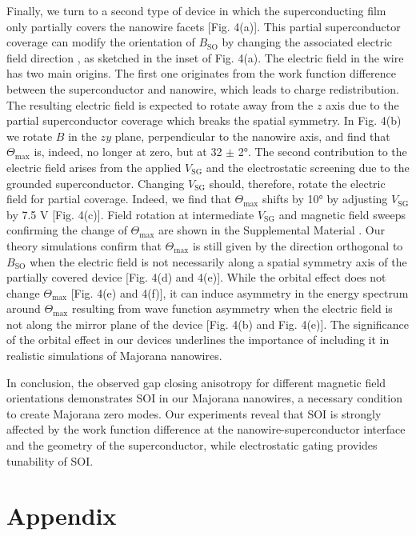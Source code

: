 Finally, we turn to a second type of device in which the superconducting film only partially covers the nanowire facets [Fig. 4(a)].
This partial superconductor coverage can modify the orientation of $B_{\mathrm{SO}}$ by changing the associated electric field direction \cite{Vuik2016}, as sketched in the inset of Fig. 4(a).
The electric field in the wire has two main origins.
The first one originates from the work function difference between the superconductor and nanowire, which leads to charge redistribution.
The resulting electric field is expected to rotate away from the $z$ axis due to the partial superconductor coverage which breaks the spatial symmetry.
In Fig. 4(b) we rotate $B$ in the $zy$ plane, perpendicular to the nanowire axis, and find that $\Theta_{\mathrm{max}}$ is, indeed, no longer at zero, but at 32 $\pm$ \ang{2}.
The second contribution to the electric field arises from the applied $V_{\mathrm{SG}}$ and the electrostatic screening due to the grounded superconductor.
Changing $V_{\mathrm{SG}}$ should, therefore, rotate the electric field for partial coverage.
Indeed, we find that $\Theta_{\mathrm{max}}$ shifts by \ang{10} by adjusting $V_{\mathrm{SG}}$ by 7.5 V [Fig. 4(c)].
Field rotation at intermediate $V_{\mathrm{SG}}$ and magnetic field sweeps confirming the change of $\Theta_{\mathrm{max}}$ are shown in the Supplemental Material \cite{Note1}.
Our theory simulations confirm that $\Theta_{\mathrm{max}}$ is still given by the direction orthogonal to $B_{\mathrm{SO}}$ when the electric field is not necessarily along a \mbox{spatial} symmetry axis of the partially covered device [Fig. 4(d) and 4(e)].
While the orbital effect does not change $\Theta_{\mathrm{max}}$ [Fig. 4(e) and 4(f)], it can induce asymmetry in the energy spectrum around $\Theta_{\mathrm{max}}$ resulting from wave function asymmetry when the electric field is not along the mirror plane of the device [Fig. 4(b) and Fig. 4(e)].
The significance of the orbital effect in our devices underlines the importance of including it in realistic simulations of Majorana nanowires.

In conclusion, the observed gap closing anisotropy for different magnetic field orientations demonstrates SOI in our Majorana nanowires, a necessary condition to create Majorana zero modes.
Our experiments reveal that SOI is strongly affected by the work function difference at the nanowire-superconductor interface and the geometry of the superconductor, while electrostatic gating provides tunability of SOI.

\section{Appendix}

